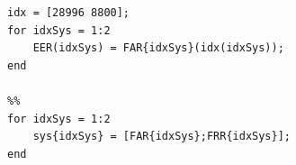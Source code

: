 \documentclass[a4paper]{article}
\begin{document}
\begin{spacing}{2.0}
\begin{lstlisting}
idx = [28996 8800];
for idxSys = 1:2
    EER(idxSys) = FAR{idxSys}(idx(idxSys));
end

%%
for idxSys = 1:2
    sys{idxSys} = [FAR{idxSys};FRR{idxSys}];
end
	\end{lstlisting}

	
\end{spacing}
\end{document}
